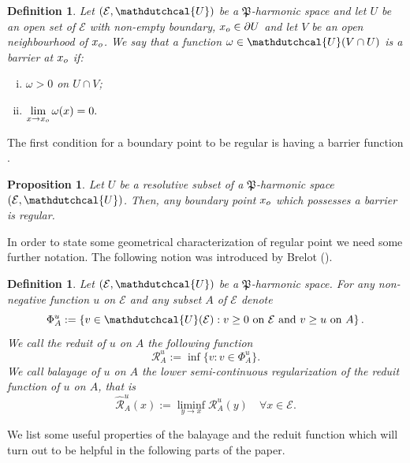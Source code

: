 \documentclass{amsart}
\newtheorem{prop}[thm]{Proposition}
\newtheorem{defn}[thm]{Definition}
\numberwithin{equation}{section}
\def \Hd{{\mathdutchcal{H}}}
\def \Ec{{\mathcal{E}}}
\def \Ud{{\mathdutchcal{U}}}
\def \reduit{{\mathcal{R}}}
\def \balayage{{\widehat{\mathcal{R}}}}
\begin{document}
{\begin{defn}
Let $(\Ec,\Ud)$ be a $\mathfrak{P}$-harmonic space and let $U$ be an open set of $\Ec$ with non-empty boundary, $x_{\rm o} \in \partial U$ and let $V$ be an open neighbourhood of $x_{\rm o}$. We say that a function $\omega \in \Ud(V \cap U)$ is a \textup{barrier at $x_{\rm o}$}  if:
\begin{enumerate}[(i)]
\item $\omega >0$ on $U \cap V$;
\item $\lim\limits_{x \rightarrow x_{\rm o}}\omega(x)=0.$
\end{enumerate}
\end{defn}
The first condition for a boundary point to be regular is having a barrier function \cite[Proposition 2.4.7]{CC72}.
\begin{prop}
Let $U$ be a resolutive subset of a $\mathfrak{P}$-harmonic space $(\Ec,\Ud)$. Then, any boundary point $x_{\rm o}$ which possesses a barrier is regular. 
\end{prop}


In order to state some geometrical characterization of regular point we need some further notation. The following notion was introduced by Brelot (\!\!\cite{Bre60}). 

\begin{defn}\label{balayage}
Let $(\Ec,\Ud)$ be a $\mathfrak{P}$-harmonic space. For any non-negative function $u$ on $\Ec$ and any subset $A$ of $\Ec$ denote
\[
\Phi_A^u :=\left\{ v \in \Ud(\Ec): v \geq 0 \ \text{on} \ \Ec \ \text{and} \ v \geq u \ \text{on} \ A\right\}.
\]
We call the \textup{reduit} of $u$ on $A$ the following function
\begin{equation*}
\reduit^u_A := \inf\big\{ v : v \in \Phi_A^u\big\}.
\end{equation*} 
We call \textup{balayage} of $u$ on $A$ the lower semi-continuous regularization of the reduit function of $u$ on $A$, that is
\begin{equation*}
\balayage^u_A (x) := \liminf_{y \rightarrow x} \reduit^u_A(y) \quad \forall x \in \Ec.
\end{equation*}
\end{defn}


We list  some useful properties of the balayage and the reduit function which will turn out to be helpful in the following parts of the paper.

}
\end{document}

